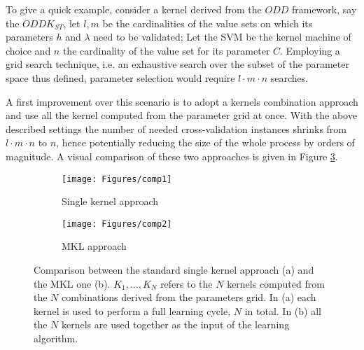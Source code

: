 
To give a quick example, consider a kernel derived from the $ODD$ framework, say
the $ODDK_{ST}$, let $l,m$ be the cardinalities of the value sets on which its parameters
$h$ and $\lambda$ need to be validated; Let the SVM be the kernel machine of choice and
$n$ the cardinality of the value set for its parameter $C$.
Employing a grid search technique, i.e. an exhaustive search over the subset
of the parameter space thus defined, parameter selection would require $l\cdot m\cdot n$
searches.

A first improvement over this scenario is to adopt a kernels combination approach 
and use all the kernel computed from the parameter grid at once.
With the above described settings the number of needed cross-validation instances
shrinks from $l\cdot m\cdot n$ to $n$, hence potentially reducing the size of the
whole process by orders of magnitude.
A visual comparison of these two approaches is given in Figure \ref{fig:comparison}.

\begin{figure}[h]
    \centering
    \begin{subfigure}{.4\textwidth}
        \centering
        \texttt{[image: Figures/comp1]}
        \caption{Single kernel approach}
        \label{fig:comp1}
    \end{subfigure}\qquad
    \begin{subfigure}{.315\textwidth}
        \centering
        \texttt{[image: Figures/comp2]}
        \caption{MKL approach}
        \label{fig:comp2}
    \end{subfigure}
    \caption{Comparison between the standard single kernel approach (a) and the MKL one (b).
    $K_1,\dots,K_N$ refers to the $N$ kernels computed from the $N$ combinations
    derived from the parameters grid. In (a) each kernel is used to perform a full learning
    cycle, $N$ in total. In (b) all the $N$ kernels are used together
    as the input of the learning algorithm.}
    \label{fig:comparison}
\end{figure}


